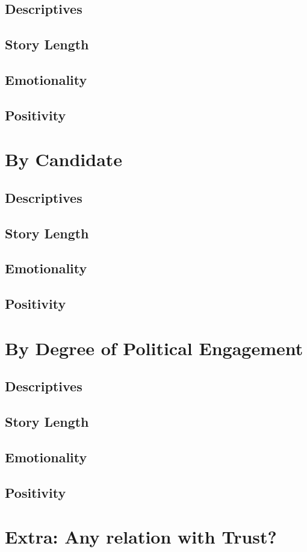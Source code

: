 \subsection{Descriptives}
\subsection{Story Length}
\subsection{Emotionality}
\subsection{Positivity}

\section{By Candidate}
\subsection{Descriptives}
\subsection{Story Length}
\subsection{Emotionality}
\subsection{Positivity}


\section{By Degree of Political Engagement}
\subsection{Descriptives}
\subsection{Story Length}
\subsection{Emotionality}
\subsection{Positivity}

\section{Extra: Any relation with Trust?}
